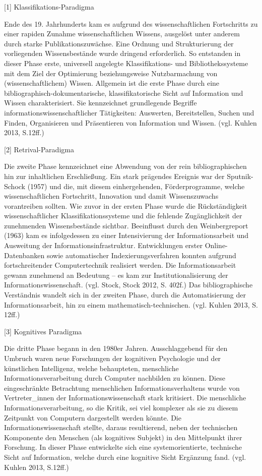 \documentclass[a4paper,
fontsize=11pt,
oneside,
numbers=noperiodatend,
parskip=half-,
bibliography=totoc,
final
]{scrartcl}
\begin{document}
{[}1{]} Klassifikations-Paradigma

Ende des 19. Jahrhunderts kam es aufgrund des wissenschaftlichen
Fortschritts zu einer rapiden Zunahme wissenschaftlichen Wissens,
ausgelöst unter anderem durch starke Publikationszuwächse. Eine Ordnung
und Strukturierung der vorliegenden Wissensbestände wurde dringend
erforderlich. So entstanden in dieser Phase erste, universell angelegte
Klassifikations- und Bibliothekssysteme mit dem Ziel der Optimierung
beziehungsweise Nutzbarmachung von (wissenschaftlichem) Wissen.
Allgemein ist die erste Phase durch eine 
bibliographisch-do\-ku\-ment\-a\-ri\-sche, klassifikatorische Sicht auf
Information und Wissen charakterisiert. Sie kennzeichnet grundlegende
Begriffe informationswissenschaftlicher Tätigkeiten: Auswerten,
Bereitstellen, Suchen und Finden, Organisieren und Präsentieren von
Information und Wissen. (vgl. Kuhlen 2013, S.12ff.)

{[}2{]} Retrival-Paradigma

Die zweite Phase kennzeichnet eine Abwendung von der rein
bibliographischen hin zur inhaltlichen Erschließung. Ein stark prägendes
Ereignis war der Sputnik-Schock (1957) und die, mit diesem
einhergehenden, Förderprogramme, welche wissenschaftlichen Fortschritt,
Innovation und damit Wissenszuwachs vorantreiben sollten. Wie zuvor in
der ersten Phase wurde die Rückständigkeit wissenschaftlicher
Klassifikationssysteme und die fehlende Zugänglichkeit der zunehmenden
Wissensbestände sichtbar. Beeinflusst durch den Weinbergreport (1963)
kam es infolgedessen zu einer Intensivierung der Informationsarbeit und
Ausweitung der Informationsinfrastruktur. Entwicklungen erster
Online-Datenbanken sowie automatischer Indexierungsverfahren konnten
aufgrund fortschreitender Computertechnik realisiert werden. Die
Informationsarbeit gewann zunehmend an Bedeutung -- es kam zur
Institutionalisierung der Informationswissenschaft. (vgl. Stock, Stock
2012, S. 402f.) Das bibliographische Verständnis wandelt sich in der
zweiten Phase, durch die Automatisierung der Informationsarbeit, hin zu
einem mathematisch-technischen. (vgl. Kuhlen 2013, S. 12ff.)

{[}3{]} Kognitives Paradigma

Die dritte Phase begann in den 1980er Jahren. Ausschlaggebend für den
Umbruch waren neue Forschungen der kognitiven Psychologie und der
künstlichen Intelligenz, welche behaupteten, menschliche
Informationsverarbeitung durch Computer nachbilden zu können. Diese
eingeschränkte Betrachtung menschlichen Informationsverhaltens wurde von
Vertreter\_innen der Informationswissenschaft stark kritisiert. Die
menschliche Informationsverarbeitung, so die Kritik, sei viel komplexer
als sie zu diesem Zeitpunkt von Computern dargestellt werden könnte. Die
Informationswissenschaft stellte, daraus resultierend, neben der
technischen Komponente den Menschen (als kognitives Subjekt) in den
Mittelpunkt ihrer Forschung. In dieser Phase entwickelte sich eine
systemorientierte, technische Sicht auf Information, welche durch eine
kognitive Sicht Ergänzung fand. (vgl. Kuhlen 2013, S.12ff.)
\end{document}
